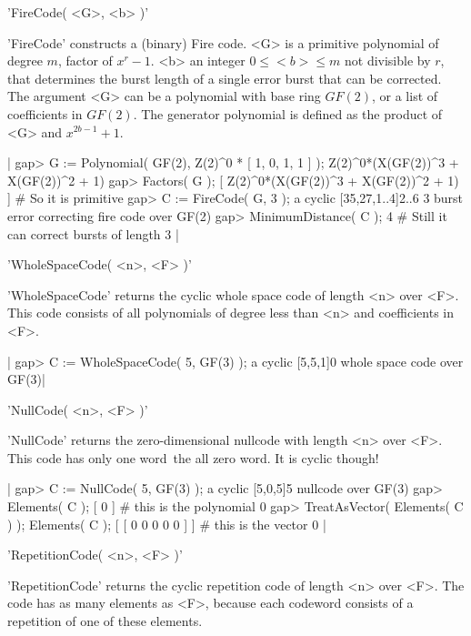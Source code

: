 'FireCode( <G>, <b> )'

'FireCode' constructs a (binary) Fire code. <G> is a primitive polynomial
of degree $m$, factor of $x^r-1$. <b> an integer $0 \leq  <b> \leq m$ not
divisible by $r$,  that  determines the  burst length  of a  single error
burst  that can be  corrected. The argument <G> can  be a polynomial with
base ring  $GF(2)$, or a list of  coefficients in $GF(2)$.  The generator
polynomial is defined as the product of <G> and $x^{2b-1}+1$.

|    gap> G := Polynomial( GF(2), Z(2)^0 * [ 1, 0, 1, 1 ] );
    Z(2)^0*(X(GF(2))^3 + X(GF(2))^2 + 1)
    gap> Factors( G );
    [ Z(2)^0*(X(GF(2))^3 + X(GF(2))^2 + 1) ]    # So it is primitive
    gap> C := FireCode( G, 3 );
    a cyclic [35,27,1..4]2..6 3 burst error correcting fire code over GF(2)
    gap> MinimumDistance( C );
    4    # Still it can correct bursts of length 3 |


'WholeSpaceCode( <n>, <F> )'

'WholeSpaceCode' returns  the cyclic whole space code  of length <n> over
<F>. This code consists  of all polynomials of  degree less than <n>  and
coefficients in <F>.

|    gap> C := WholeSpaceCode( 5, GF(3) );
    a cyclic [5,5,1]0 whole space code over GF(3)|


'NullCode( <n>, <F> )'

'NullCode' returns  the  zero-dimensional nullcode with  length  <n> over
<F>. This code  has only  one word\:\ the  all zero  word. It is   cyclic
though!

|    gap> C := NullCode( 5, GF(3) );
    a cyclic [5,0,5]5 nullcode over GF(3)
    gap> Elements( C );
    [ 0 ]                # this is the polynomial 0
    gap> TreatAsVector( Elements( C ) ); Elements( C );
    [ [ 0 0 0 0 0 ] ]    # this is the vector 0 |


'RepetitionCode( <n>, <F> )'

'RepetitionCode' returns the  cyclic repetition code  of length  <n> over
<F>. The code has as many elements as <F>, because each codeword consists
of a repetition of one of these elements.

